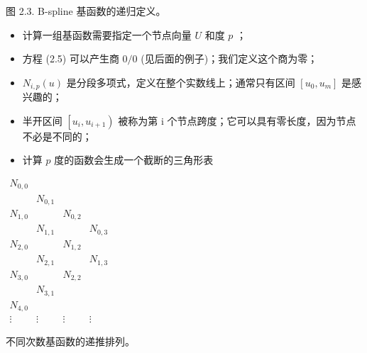 \documentclass[../main.tex]{subfiles}
\begin{document}
\begin{center}
\begin{minipage}{18cm}
\vspace*{.6\baselineskip}
\centering
{}
\par\smallskip
图 2.3. B-spline 基函数的递归定义。
\end{minipage}
\end{center}

\begin{itemize}
\item 计算一组基函数需要指定一个节点向量 \(U\) 和度 \(p\) ；
\end{itemize}

\begin{itemize}
\item 方程 (2.5) 可以产生商 \(0/0\) (见后面的例子)；我们定义这个商为零；
\end{itemize}

\begin{itemize}
\item \({N}_{i,p}\left( u\right)\) 是分段多项式，定义在整个实数线上；通常只有区间 \(\left\lbrack  {{u}_{0},{u}_{m}}\right\rbrack\) 是感兴趣的；
\end{itemize}

\begin{itemize}
\item 半开区间 \(\left\lbrack  {{u}_{i},{u}_{i + 1}}\right)\) 被称为第 i 个节点跨度；它可以具有零长度，因为节点不必是不同的；
\end{itemize}

\begin{itemize}
\item 计算 \(p\) 度的函数会生成一个截断的三角形表
\end{itemize}

\begin{center}
\small
\(\begin{array}{cccc}
N_{0,0} & & & \\
 & N_{0,1} & & \\
N_{1,0} & & N_{0,2} & \\
 & N_{1,1} & & N_{0,3} \\
N_{2,0} & & N_{1,2} & \\
 & N_{2,1} & & N_{1,3} \\
N_{3,0} & & N_{2,2} & \\
 & N_{3,1} & & \\
N_{4,0} & & & \\
\vdots & \vdots & \vdots & \vdots
\end{array}\)
\par\smallskip
不同次数基函数的递推排列。
\end{center}
\end{document}
